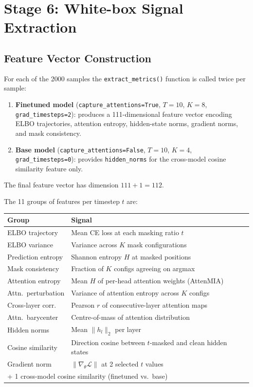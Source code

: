 \documentclass[11pt,a4paper]{article}
\begin{document}
\section{Stage 6: White-box Signal Extraction}
\label{sec:signals}

\subsection{Feature Vector Construction}

For each of the 2000 samples the \texttt{extract\_metrics()} function is called
twice per sample:
\begin{enumerate}
  \item \textbf{Finetuned model} (\texttt{capture\_attentions=True},
        $T=10$, $K=8$, \texttt{grad\_timesteps=2}):
        produces a 111-dimensional feature vector encoding ELBO trajectories,
        attention entropy, hidden-state norms, gradient norms, and mask
        consistency.
  \item \textbf{Base model} (\texttt{capture\_attentions=False},
        $T=10$, $K=4$, \texttt{grad\_timesteps=0}):
        provides \texttt{hidden\_norms} for the cross-model cosine similarity
        feature only.
\end{enumerate}
The final feature vector has dimension $111 + 1 = 112$.

The 11 groups of features per timestep $t$ are:
\begin{center}
\begin{tabular}{ll}
\toprule
Group & Signal \\
\midrule
ELBO trajectory    & Mean CE loss at each masking ratio $t$ \\
ELBO variance      & Variance across $K$ mask configurations \\
Prediction entropy & Shannon entropy $H$ at masked positions \\
Mask consistency   & Fraction of $K$ configs agreeing on argmax \\
Attention entropy  & Mean $H$ of per-head attention weights (AttenMIA) \\
Attn.\ perturbation & Variance of attention entropy across $K$ configs \\
Cross-layer corr.  & Pearson $r$ of consecutive-layer attention maps \\
Attn.\ barycenter  & Centre-of-mass of attention distribution \\
Hidden norms       & Mean $\|h_l\|_2$ per layer \\
Cosine similarity  & Direction cosine between $t$-masked and clean hidden states \\
Gradient norm      & $\|\nabla_\theta \mathcal{L}\|$ at 2 selected $t$ values \\
\midrule
\multicolumn{2}{l}{+ 1 cross-model cosine similarity (finetuned vs.\ base)} \\
\bottomrule
\end{tabular}
\end{center}
\end{document}
